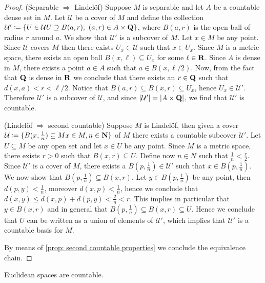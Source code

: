 \begin{proof}
(Separable \(\Rightarrow\) Lindelöf) Suppose \(M\) is separable and let \(A\)
be a countable dense set in \(M\). Let \(\mathcal U\) be a cover of \(M\) and
define the collection \(\mathcal U' \coloneq \{U \in \mathcal U \relax U
\supseteq B(a, r),\ (a, r) \in A \times \mathbf{Q}\}\), where \(B(a,r)\) is the open
ball of radius \(r\) around \(a\). We show that \(\mathcal U'\) is a subcover of
\(M\).  Let \(x \in M\) be any point. Since \(\mathcal U\) covers \(M\) then
there exists \(U_x \in \mathcal U\) such that \(x \in U_x\). Since \(M\) is a
metric space, there exists an open ball \(B(x, \ell) \subseteq U_x\) for some
\(\ell \in \mathbf{R}\).  Since \(A\) is dense in \(M\), there exists a point \(a \in
A\) such that \(a \in B(x, \ell/2)\). Now, from the fact that \(\mathbf{Q}\) is dense in
\(\mathbf{R}\) we conclude that there exists an \(r \in \mathbf{Q}\) such that \(d(x, a) < r <
\ell/2\). Notice that \(B(a, r) \subseteq B(x, r) \subseteq U_x\), hence \(U_x
\in \mathcal U'\). Therefore \(\mathcal U'\) is a subcover of \(\mathcal U\),
and since \(|\mathcal U'| = |A \times \mathbf{Q}|\), we find that \(\mathcal U'\) is
countable.

(Lindelöf \(\Rightarrow\) second countable) Suppose \(M\) is Lindelöf, then
given a cover \(\mathcal U \coloneq \{B(x, \frac{1}{n}) \subseteq M \relax x \in M, n
\in \mathbf{N}\}\) of \(M\) there exists a countable subcover \(\mathcal U'\). Let \(U
\subseteq M\) be any open set and let \(x \in U\) be any point. Since \(M\) is a
metric space, there exists \(r > 0\) such that \(B(x, r) \subseteq U\). Define
now \(n \in N\) such that \(\frac 1 n < \frac r 2\). Since \(\mathcal U'\) is a
cover of \(M\), there exists a \(B(p, \frac 1 n) \in \mathcal U'\) such that \(x
\in B(p, \frac 1 n)\). We now show that \(B(p, \frac 1 n) \subseteq B(x,
r)\). Let \(y \in B(p, \frac 1 n)\) be any point, then \(d(p, y) < \frac 1 n\),
moreover \(d(x, p) < \frac 1 n\), hence we conclude that \(d(x, y) \leq d(x, p)
+ d(p, y) < \frac 2 n < r\). This implies in particular that \(y \in B(x, r)\)
and in general that \(B(p, \frac 1 n) \subseteq B(x, r) \subseteq U\). Hence we
conclude that \(U\) can be written as a union of elements of \(\mathcal U'\),
which implies that \(\mathcal U'\) is a countable basis for \(M\).

By means of \cref{prop: second countable properties} we conclude the
equivalence chain.
\end{proof}

\begin{corollary}
\label{cor:euclidean-space-second-countable}
Euclidean spaces are countable.
\end{corollary}

